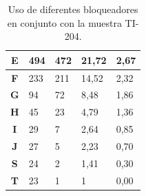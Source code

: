 \documentclass{article}									%
\begin{document}
\begin{table}[H]
\begin{tabular}{|c|l|l|l|l|}
\textbf{E}         & 494                               & 472                                                                                                & 21,72                                                                                       & 2,67                                    \\ \hline
\textbf{F}         & 233                               & 211                                                                                                & 14,52                                                                                       & 2,32                                    \\ \hline
\textbf{G}         & 94                                & 72                                                                                                 & 8,48                                                                                        & 1,86                                    \\ \hline
\textbf{H}         & 45                                & 23                                                                                                 & 4,79                                                                                        & 1,36                                    \\ \hline
\textbf{I}         & 29                                & 7                                                                                                  & 2,64                                                                                        & 0,85                                    \\ \hline
\textbf{J}         & 27                                & 5                                                                                                  & 2,23                                                                                        & 0,70                                    \\ \hline
\textbf{S}         & 24                                & 2                                                                                                  & 1,41                                                                                        & 0,30                                    \\ \hline
\textbf{T}         & 23                                & 1                                                                                                  & 1                                                                                           & 0,00                                    \\ \hline
\end{tabular}
\caption{Uso de diferentes bloqueadores en conjunto con la muestra TI-204.}
\label{bloqueador}
\end{table}
\end{document}
